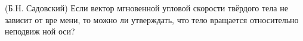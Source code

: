 (Б.Н. Садовский)
Если вектор мгновенной угловой скорости твёрдого тела не зависит от вре
мени, то можно ли утверждать, что тело вращается относительно неподвиж
ной оси?
